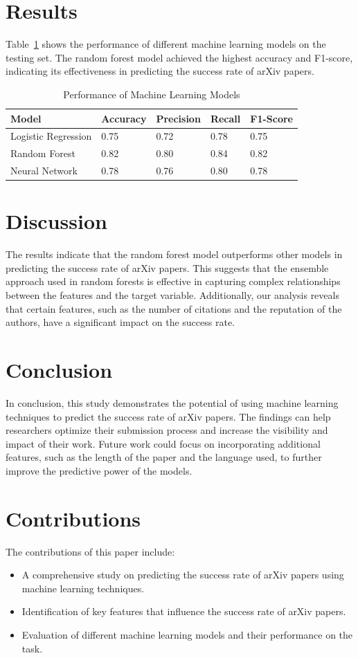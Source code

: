 \documentclass{article}
\begin{document}
\section{Results}
Table~\ref{tab:results} shows the performance of different machine learning models on the testing set. The random forest model achieved the highest accuracy and F1-score, indicating its effectiveness in predicting the success rate of arXiv papers.

\begin{table}[ht]
\centering
\caption{Performance of Machine Learning Models}
\label{tab:results}
\begin{tabular}{@{}lllll@{}}
\toprule
Model & Accuracy & Precision & Recall & F1-Score \\ \midrule
Logistic Regression & 0.75 & 0.72 & 0.78 & 0.75 \\
Random Forest & 0.82 & 0.80 & 0.84 & 0.82 \\
Neural Network & 0.78 & 0.76 & 0.80 & 0.78 \\ \bottomrule
\end{tabular}
\end{table}

\section{Discussion}
The results indicate that the random forest model outperforms other models in predicting the success rate of arXiv papers. This suggests that the ensemble approach used in random forests is effective in capturing complex relationships between the features and the target variable. Additionally, our analysis reveals that certain features, such as the number of citations and the reputation of the authors, have a significant impact on the success rate.

\section{Conclusion}
In conclusion, this study demonstrates the potential of using machine learning techniques to predict the success rate of arXiv papers. The findings can help researchers optimize their submission process and increase the visibility and impact of their work. Future work could focus on incorporating additional features, such as the length of the paper and the language used, to further improve the predictive power of the models.

\section{Contributions}
The contributions of this paper include:
\begin{itemize}
    \item A comprehensive study on predicting the success rate of arXiv papers using machine learning techniques.
    \item Identification of key features that influence the success rate of arXiv papers.
    \item Evaluation of different machine learning models and their performance on the task.
\end{itemize}
\end{document}
